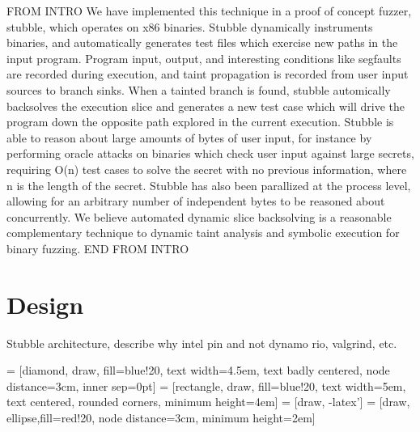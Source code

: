 \documentclass[11pt,expanded,copyright]{fsuthesis}
\begin{document}
FROM INTRO
We have implemented this technique in a proof of concept fuzzer, stubble, which operates on x86 binaries. Stubble dynamically instruments binaries, and automatically generates test files which exercise new paths in the input program. Program input, output, and interesting conditions like segfaults are recorded during execution, and taint propagation is recorded from user input sources to branch sinks. When a tainted branch is found, stubble automically backsolves the execution slice and generates a new test case which will drive the program down the opposite path explored in the current execution. Stubble is able to reason about large amounts of bytes of user input, for instance by performing oracle attacks on binaries which check user input against large secrets, requiring O(n) test cases to solve the secret with no previous information, where n is the length of the secret. Stubble has also been parallized at the process level, allowing for an arbitrary number of independent bytes to be reasoned about concurrently. We believe automated dynamic slice backsolving is a reasonable complementary technique to dynamic taint analysis and symbolic execution for binary fuzzing.
END FROM INTRO

\section{Design}

Stubble architecture, describe
why intel pin and not dynamo rio, valgrind, etc.



 = [diamond, draw, fill=blue!20, 
    text width=4.5em, text badly centered, node distance=3cm, inner sep=0pt]
 = [rectangle, draw, fill=blue!20, 
    text width=5em, text centered, rounded corners, minimum height=4em]
 = [draw, -latex']
 = [draw, ellipse,fill=red!20, node distance=3cm,
    minimum height=2em]
    
\end{document}
